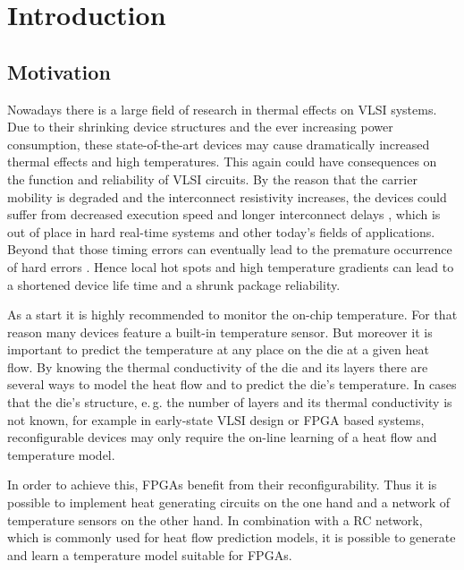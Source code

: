  
\chapter{Introduction}
\label{ch:intro}
\section{Motivation}
Nowadays there is a large field of research in thermal effects on \ac{VLSI} systems. Due to their shrinking device structures and the ever increasing power consumption, these state-of-the-art devices may cause dramatically increased thermal effects and high temperatures. This again could have consequences on the function and reliability of \ac{VLSI} circuits. By the reason that the carrier mobility is degraded and the interconnect resistivity increases, the devices could suffer from decreased execution speed and longer interconnect delays \cite{Huang2006}, which is out of place in hard real-time systems and other today's fields of applications. Beyond that those timing errors can eventually lead to the premature occurrence of hard errors \cite{Borkar2005}. Hence local hot spots and high temperature gradients can lead to a shortened device life time and a shrunk package reliability.

As a start it is highly recommended to monitor the on-chip temperature. For that reason many devices feature a built-in temperature sensor. But moreover it is important to predict the temperature at any place on the die at a given heat flow. By knowing the thermal conductivity of the die and its layers there are several ways to model the heat flow and to predict the die's temperature. 
In cases that the die's structure, e.\,g. the number of layers and its thermal conductivity is not known, for example in early-state \ac{VLSI} design or \ac{FPGA} based systems, reconfigurable devices may only require the on-line learning of a heat flow and temperature model.

In order to achieve this, \acp{FPGA} benefit from their reconfigurability. Thus it is possible to implement heat generating circuits on the one hand and a network of temperature sensors on the other hand. In combination with a \ac{RC} network, which is commonly used for heat flow prediction models, it is possible to generate and learn a temperature model suitable for \acp{FPGA}. 

